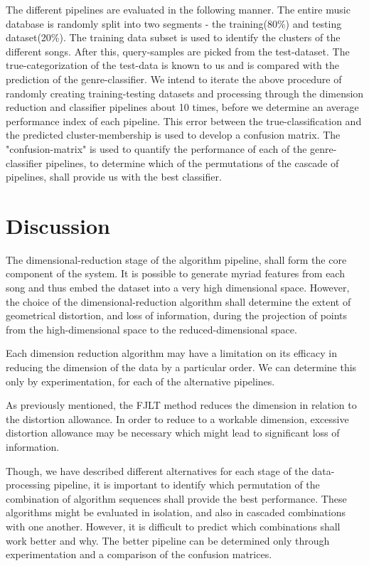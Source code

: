 \documentclass[12pt]{article}
\begin{document}
The different pipelines are evaluated in the following manner. The entire music database is randomly split into two segments - the training(80\%) and testing dataset(20\%). The training data subset is used to identify the clusters of the different songs. After this, query-samples are picked from the test-dataset. The true-categorization of the test-data is known to us and is compared with the prediction of the genre-classifier. 
We intend to iterate the above procedure of randomly creating training-testing datasets and processing through the dimension reduction and classifier pipelines about 10 times, before we determine an average performance index of each pipeline. 
This error between the true-classification and the predicted cluster-membership is used to develop a confusion matrix. The "confusion-matrix" is used to quantify the performance of each of the genre-classifier pipelines, to determine which of the permutations of the cascade of pipelines, shall provide us with the best classifier. 


\section{Discussion}

The dimensional-reduction stage of the algorithm pipeline, shall form the core component of the system. It is possible to generate myriad features from each song and thus embed the dataset into a very high dimensional space. However, the choice of the dimensional-reduction algorithm shall determine the extent of geometrical distortion, and loss of information, during the projection of points from the high-dimensional space to the reduced-dimensional space. 

Each dimension reduction algorithm may have a limitation on its efficacy in reducing the dimension of the data by a particular order. We can determine this only by experimentation, for each of the alternative pipelines. 

As previously mentioned, the FJLT method reduces the dimension in relation to the distortion allowance.  In order to reduce to a workable dimension, excessive distortion allowance may be necessary which might lead to significant loss of information.

Though, we have described different alternatives for each stage of the data-processing pipeline, it is important to identify which permutation of the combination of algorithm sequences shall provide the best performance. These algorithms might be evaluated in isolation, and also in cascaded combinations with one another. However, it is difficult to predict which combinations shall work better and why. The better pipeline can be determined only through experimentation and a comparison of the confusion matrices. 
\end{document}
